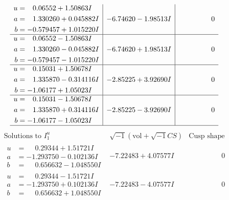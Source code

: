 \documentclass[1p]{elsarticle_modified}
\theoremstyle{definition}
\newcommand{\I}{\sqrt{-1}}
\begin{document}
$$\begin{array}{c|c|c}
\begin{aligned}
u &= \phantom{-}0.06552 + 1.50863 I \\
a &= \phantom{-}1.330260 + 0.045882 I \\
b &= -0.579457 + 1.015220 I\end{aligned}
 & -6.74620 - 1.98513 I & \phantom{-0.000000 } 0 \\ \hline\begin{aligned}
u &= \phantom{-}0.06552 - 1.50863 I \\
a &= \phantom{-}1.330260 - 0.045882 I \\
b &= -0.579457 - 1.015220 I\end{aligned}
 & -6.74620 + 1.98513 I & \phantom{-0.000000 } 0 \\ \hline\begin{aligned}
u &= \phantom{-}0.15031 + 1.50678 I \\
a &= \phantom{-}1.335870 - 0.314116 I \\
b &= -1.06177 + 1.05023 I\end{aligned}
 & -2.85225 + 3.92690 I & \phantom{-0.000000 } 0 \\ \hline\begin{aligned}
u &= \phantom{-}0.15031 - 1.50678 I \\
a &= \phantom{-}1.335870 + 0.314116 I \\
b &= -1.06177 - 1.05023 I\end{aligned}
 & -2.85225 - 3.92690 I & \phantom{-0.000000 } 0\\
 \hline 
 \end{array}$$\newpage$$\begin{array}{c|c|c}  
\text{Solutions to }I^u_{1}& \I (\text{vol} + \sqrt{-1}CS) & \text{Cusp shape}\\
 \hline 
\begin{aligned}
u &= \phantom{-}0.29344 + 1.51721 I \\
a &= -1.293750 - 0.102136 I \\
b &= \phantom{-}0.656632 - 1.048550 I\end{aligned}
 & -7.22483 + 4.07577 I & \phantom{-0.000000 } 0 \\ \hline\begin{aligned}
u &= \phantom{-}0.29344 - 1.51721 I \\
a &= -1.293750 + 0.102136 I \\
b &= \phantom{-}0.656632 + 1.048550 I\end{aligned}
 & -7.22483 - 4.07577 I & \phantom{-0.000000 } 0 \\ \hline\begin{aligned}

\end{aligned}
\end{array}$$
\end{document}
